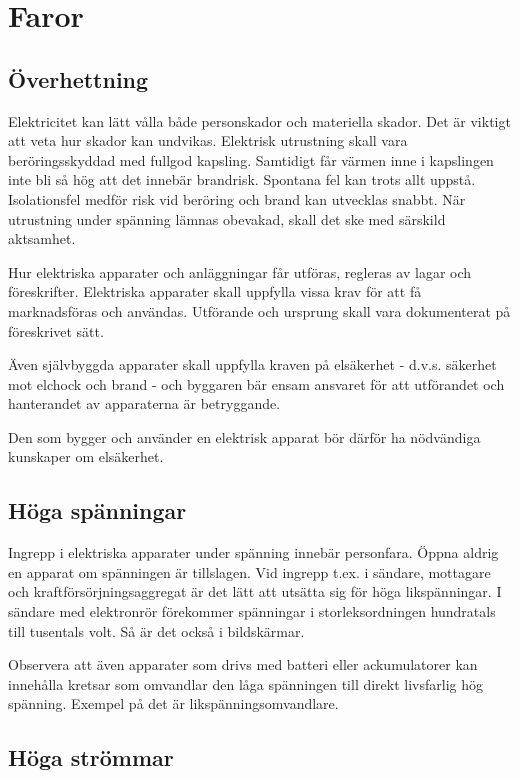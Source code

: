 \section{Faror}

\subsection{Överhettning}

Elektricitet kan lätt vålla både personskador och materiella
skador. Det är viktigt att veta hur skador kan undvikas. Elektrisk
utrustning skall vara beröringsskyddad med fullgod kapsling. Samtidigt
får värmen inne i kapslingen inte bli så hög att det innebär
brandrisk. Spontana fel kan trots allt uppstå.  Isolationsfel medför
risk vid beröring och brand kan utvecklas snabbt. När utrustning under
spänning lämnas obevakad, skall det ske med särskild aktsamhet.

Hur elektriska apparater och anläggningar får utföras, regleras av
lagar och föreskrifter. Elektriska apparater skall uppfylla vissa krav
för att få marknadsföras och användas. Utförande och ursprung skall
vara dokumenterat på föreskrivet sätt.

Även självbyggda apparater skall uppfylla kraven på elsäkerhet -
d.v.s. säkerhet mot elchock och brand - och byggaren bär ensam
ansvaret för att utförandet och hanterandet av apparaterna är
betryggande.

Den som bygger och använder en elektrisk apparat bör därför ha
nödvändiga kunskaper om elsäkerhet.

\subsection{Höga spänningar}

Ingrepp i elektriska apparater under spänning innebär
personfara. Öppna aldrig en apparat om spänningen är tillslagen. Vid
ingrepp t.ex. i sändare, mottagare och kraftförsörjningsaggregat är
det lätt att utsätta sig för höga likspänningar. I sändare med
elektronrör förekommer spänningar i storleksordningen hundratals till
tusentals volt. Så är det också i bildskärmar.

Observera att även apparater som drivs med batteri eller ackumulatorer
kan innehålla kretsar som omvandlar den låga spänningen till direkt
livsfarlig hög spänning. Exempel på det är likspänningsomvandlare.

\subsection{Höga strömmar}

